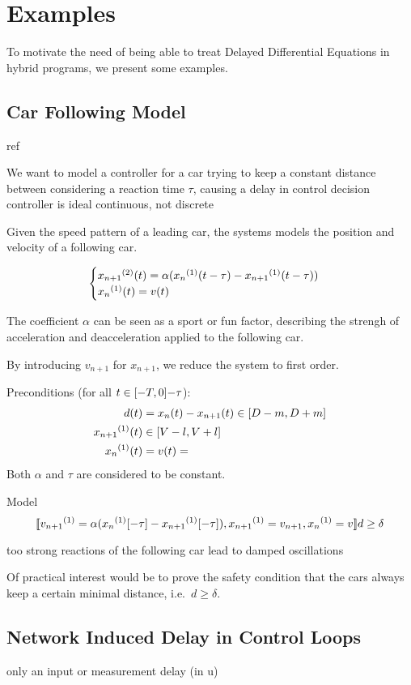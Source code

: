 \chapter{Examples}\label{sec:example-hp}

To motivate the need of being able to treat Delayed Differential Equations in hybrid programs, we present some examples.

\section{Car Following Model}

    ref

    We want to model a controller for a car
    trying to keep a constant distance between
    considering a reaction time $\tau$, causing a delay in control decision
    controller is ideal continuous, not discrete

    Given the speed pattern of a leading car, the systems models the position and velocity of a following car.

    \begin{equation*}
        \begin{cases}
            \D[2]{x_{n+1}}(t) = \alpha (\D{x_n}(t-\tau)-\D{x_{n+1}}(t-\tau))\\
            \D{x_n}(t) = v(t)
        \end{cases}
    \end{equation*}

    The coefficient $\alpha$ can be seen as a sport or fun factor, describing the strengh of acceleration and deacceleration applied to the following car.

    By introducing $v_{n+1}$ for $x_{n+1}$, we reduce the system to first order.

    Preconditions (for all $t\in[-T,0]{-\tau}$):
    \begin{align*}
        d(t) &= x_n(t)-x_{n+1}(t) \in\compactum{D-m}{D+m}\\
        \D{x_{n+1}}(t) &\in\compactum{V-l}{V+l}\\
        \D{x_n}(t) &= v(t) = 
    \end{align*}
    Both $\alpha$ and $\tau$ are considered to be constant.

    Model
    \begin{equation*}
        \dbox{\hevolve{
            \D{v_{n+1}} = \alpha(\D{x_n}[-\tau]-\D{x_{n+1}}[-\tau])\syssep
            \D{x_{n+1}} = v_{n+1}\syssep
            \D{x_n} = v
        }}{d\geq\delta}
    \end{equation*}

    too strong reactions of the following car lead to damped oscillations

    Of practical interest would be to prove the safety condition that the cars always keep a certain minimal distance, i.e.\ $d\geq\delta$.

\section{Network Induced Delay in Control Loops}

    only an input or measurement delay (in u)
